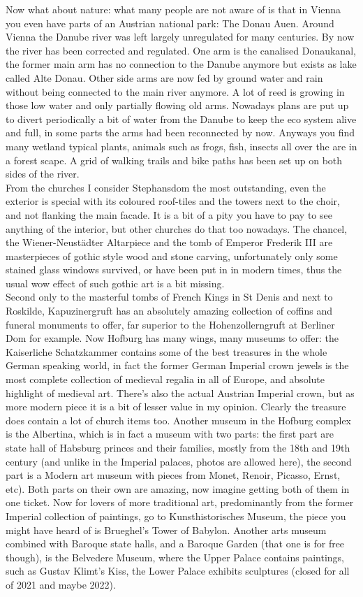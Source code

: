 Now what about nature: what many people are not aware of is that in Vienna you even have parts of an Austrian national park: The Donau Auen. Around Vienna the Danube river was left largely unregulated for many centuries. By now the river has been corrected and regulated. One arm is the canalised Donaukanal, the former main arm has no connection to the Danube anymore but exists as lake called Alte Donau. Other side arms are now fed by ground water and rain without being connected to the main river anymore. A lot of reed is growing in those low water and only partially flowing old arms. Nowadays plans are put up to divert periodically a bit of water from the Danube to keep the eco system alive and full, in some parts the arms had been reconnected by now. Anyways you find many wetland typical plants, animals such as frogs, fish, insects all over the are in a forest scape. A grid of walking trails and bike paths has been set up on both sides of the river.\\
From the churches I consider Stephansdom the most outstanding, even the exterior is special with its coloured roof-tiles and the towers next to the choir, and not flanking the main facade. It is a bit of a pity you have to pay to see anything of the interior, but other churches do that too nowadays. The chancel, the Wiener-Neust\"adter Altarpiece and the tomb of Emperor Frederik III are masterpieces of gothic style wood and stone carving, unfortunately only some stained glass windows survived, or have been put in in modern times, thus the usual wow effect of such gothic art is a bit missing. \\
Second only to the masterful tombs of French Kings in St Denis and next to Roskilde, Kapuzinergruft has an absolutely amazing collection of coffins and funeral monuments to offer, far superior to the Hohenzollerngruft at Berliner Dom for example. Now Hofburg has many wings, many museums to offer: the Kaiserliche Schatzkammer contains some of the best treasures in the whole German speaking world, in fact the former German Imperial crown jewels is the most complete collection of medieval regalia in all of Europe, and absolute highlight of medieval art. There's also the actual Austrian Imperial crown, but as more modern piece it is a bit of lesser value in my opinion. Clearly the treasure does contain a lot of church items too. Another museum in the Hofburg complex is the Albertina, which is in fact a museum with two parts: the first part are state hall of Habsburg princes and their families, mostly from the 18th and 19th century (and unlike in the Imperial palaces, photos are allowed here), the second part is a Modern art museum with pieces from Monet, Renoir, Picasso, Ernst, etc). Both parts on their own are amazing, now imagine getting both of them in one ticket. Now for lovers of more traditional art, predominantly from the former Imperial collection of paintings, go to Kunsthistorisches Museum, the piece you might have heard of is Brueghel's Tower of Babylon. Another arts museum combined with Baroque state halls, and a Baroque Garden (that one is for free though), is the Belvedere Museum, where the Upper Palace contains paintings, such as Gustav Klimt's Kiss, the Lower Palace exhibits sculptures (closed for all of 2021 and maybe 2022). \\
